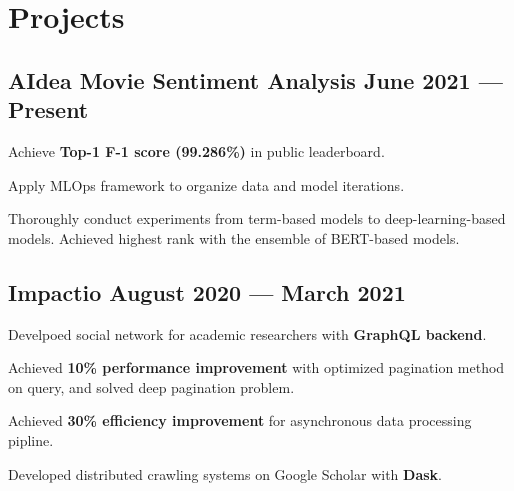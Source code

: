 \section{Projects}



\subsection*{AIdea Movie Sentiment Analysis \hfill June 2021 --- Present} 
\begin{zitemize}
    \item Achieve \textbf{Top-1 F-1 score (99.286\%)} in public leaderboard.
    \item Apply MLOps framework to organize data and model iterations.
    \item Thoroughly conduct experiments from term-based models to deep-learning-based models. Achieved highest rank with the ensemble of BERT-based models.
\end{zitemize}


\subsection*{Impactio \hfill August 2020 --- March 2021} 
    \begin{zitemize}
        \item Develpoed social network for academic researchers with \textbf{GraphQL backend}.
        \item Achieved \textbf{10\% performance improvement} with optimized pagination method on query, and solved deep pagination problem.
        \item Achieved \textbf{30\% efficiency improvement} for asynchronous data processing pipline.
        \item Developed distributed crawling systems on Google Scholar with \textbf{Dask}.
    \end{zitemize}


